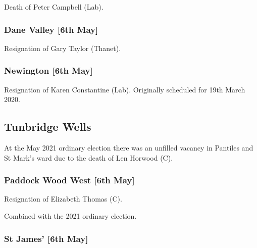 \documentclass[a4paper,openany]{book}
\begin{document}
\begin{resultsiii}
Death of Peter Campbell (Lab).

\subsubsection*{Dane Valley \hspace*{\fill}\nolinebreak[1]%
	\enspace\hspace*{\fill}
	[6th May]}


Resignation of Gary Taylor (Thanet).

\subsubsection*{Newington \hspace*{\fill}\nolinebreak[1]%
	\enspace\hspace*{\fill}
	[6th May]}


Resignation of Karen Constantine (Lab).  Originally scheduled for 19th March 2020.

\subsection*{Tunbridge Wells}

At the May 2021 ordinary election there was an unfilled vacancy in Pantiles and St Mark's ward due to the death of Len Horwood (C).

\subsubsection*{Paddock Wood West \hspace*{\fill}\nolinebreak[1]%
	\enspace\hspace*{\fill}
	[6th May]}


Resignation of Elizabeth Thomas (C).

Combined with the 2021 ordinary election.

\subsubsection*{St James' \hspace*{\fill}\nolinebreak[1]%
	\enspace\hspace*{\fill}
	[6th May]}


\end{resultsiii}
\end{document}
